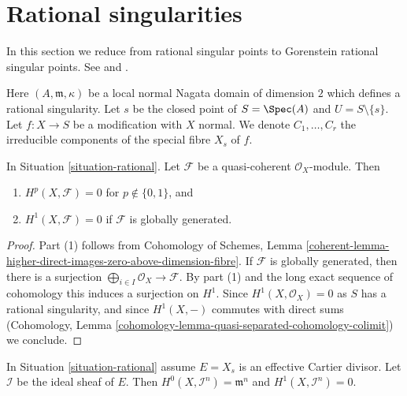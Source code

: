 \section{Rational singularities}
\label{section-rational-singularities}

\noindent
In this section we reduce from rational singular points to
Gorenstein rational singular points. See \cite{Lipman-rational} and
\cite{Mattuck}.

\begin{situation}
\label{situation-rational}
Here $(A, \mathfrak m, \kappa)$ be a local normal Nagata domain of
dimension $2$ which defines a rational singularity. Let $s$ be the closed
point of $S = \Spec(A)$ and $U = S \setminus \{s\}$. Let $f : X \to S$
be a modification with $X$ normal.
We denote $C_1, \ldots, C_r$ the irreducible
components of the special fibre $X_s$ of $f$.
\end{situation}

\begin{lemma}
\label{lemma-globally-generated}
In Situation \ref{situation-rational}.
Let $\mathcal{F}$ be a quasi-coherent $\mathcal{O}_X$-module. Then
\begin{enumerate}
\item $H^p(X, \mathcal{F}) = 0$ for $p \not \in \{0, 1\}$, and
\item $H^1(X, \mathcal{F}) = 0$ if $\mathcal{F}$ is globally generated.
\end{enumerate}
\end{lemma}

\begin{proof}
Part (1) follows from  Cohomology of Schemes, Lemma
\ref{coherent-lemma-higher-direct-images-zero-above-dimension-fibre}.
If $\mathcal{F}$ is globally generated, then there is a surjection
$\bigoplus_{i \in I} \mathcal{O}_X \to \mathcal{F}$. By part (1)
and the long exact sequence of cohomology this
induces a surjection on $H^1$. Since $H^1(X, \mathcal{O}_X) = 0$
as $S$ has a rational singularity, and since $H^1(X, -)$ commutes
with direct sums
(Cohomology, Lemma \ref{cohomology-lemma-quasi-separated-cohomology-colimit})
we conclude.
\end{proof}

\begin{lemma}
\label{lemma-sections-powers-I-rational}
In Situation \ref{situation-rational} assume
$E = X_s$ is an effective Cartier divisor.
Let $\mathcal{I}$ be the ideal sheaf of $E$. Then
$H^0(X, \mathcal{I}^n) = \mathfrak m^n$ and
$H^1(X, \mathcal{I}^n) = 0$.
\end{lemma}

